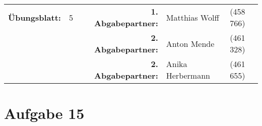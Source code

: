 \newcommand{\obenlinks}{Software Engineering}		%

\usepackage{float}


	\begin{center}
		\begin{tabular}{|rlp{4cm}rll|}
		\hline
		 \textbf{Übungsblatt:} & 5 &   & \textbf{1. Abgabepartner:} & Matthias Wolff & (458 766)  \\
		        & & & \textbf{2. Abgabepartner:} & Anton Mende & (461 328) \\
		        & & & \textbf{2. Abgabepartner:} & Anika Herbermann & (461 655) \\ \hline
		\end{tabular}
	\end{center}
\section*{Aufgabe 15}
